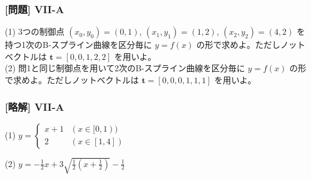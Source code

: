 \documentclass[dvipdfmx,aspectratio=169,20pt]{beamer}
\newcommand{\myfontsetting}[3]{{\fontsize{#1}{#2}\selectfont #3}}
\begin{document}
\begin{frame}
\frametitle{[問題] V\hspace{-.1em}I\hspace{-.1em}I-A}


\myfontsetting{18pt}{18pt}{
(1) 3つの制御点 $(x_0,y_0)=(0,1)$, $(x_1,y_1)=(1,2)$, $(x_2,y_2)=(4,2)$ を持つ1次のB-スプライン曲線を区分毎に $y=f(x)$ の形で求めよ。ただしノットベクトルは $\bm{t}=[0,0,1,2,2]$ を用いよ。\\
(2) 問1と同じ制御点を用いて2次のB-スプライン曲線を区分毎に $y=f(x)$ の形で求めよ。ただしノットベクトルは $\bm{t}=[0,0,0,1,1,1]$ を用いよ。
}
\end{frame}
\begin{frame}
\frametitle{[略解] V\hspace{-.1em}I\hspace{-.1em}I-A}
(1) \hspace{5mm} $y=\begin{cases}
x+1 & (x\in [0,1))\\
2 & (x\in [1,4])
\end{cases}$

\vspace{5mm}

(2) \hspace{5mm} $y=-\frac{1}{2} x + 3\sqrt{\frac{1}{2}\left(x + \frac{1}{2}\right)} - \frac{1}{2}$

\end{frame}
\end{document}
